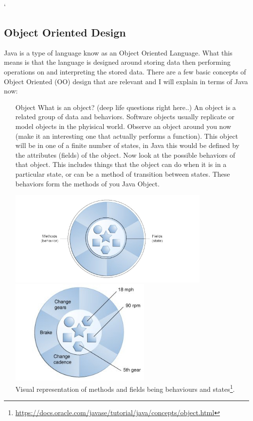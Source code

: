 `\documentclass[a4paper,11pt]{report}
\begin{document}
\begin{description}
					

					

					\pagebreak

					\section{Object Oriented Design}
						Java is a type of language know as an Object Oriented Language. What this means is that the language is designed around storing data then performing operations on and interpreting the stored data.
						There are a few basic concepts of Object Oriented (OO) design that are relevant and I will explain in terms of Java now:
						\begin{itemize}
							\item[Object]
								What is an object? (deep life questions right here..) An object is a related group of data and behaviors. Software objects usually replicate or model objects in the phyisical world.
								Observe an object around you now (make it an interesting one that actually performs a function). This object will be in one of a finite number of states, in Java this would be defined by the attributes (fields) of the object.
								Now look at the possible behaviors of that object. This includes things that the object can do when it is in a particular state, or can be a method of transition between states. These behaviors form the methods of you Java Object.

								\begin{center}
									\includegraphics[width = 10cm]{img/concepts_object.jpg}\\
									\includegraphics[width=7cm]{img/concepts_bicycleObject.jpg}\\
									Visual representation of methods and fields being behaviours and states\footnote{\url{https://docs.oracle.com/javase/tutorial/java/concepts/object.html}}.
								\end{center}


\end{itemize}
\end{description}
\end{document}
